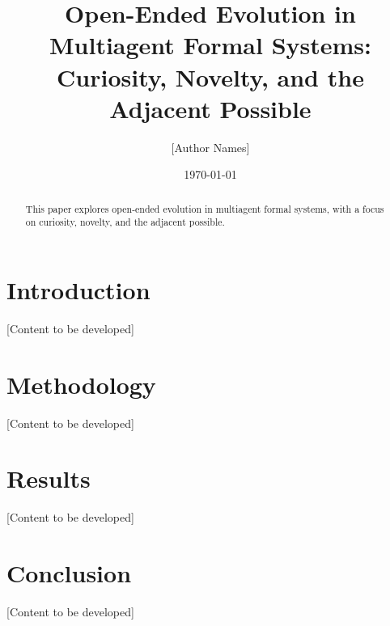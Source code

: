 \documentclass{article}
\title{Open-Ended Evolution in Multiagent Formal Systems: Curiosity, Novelty, and the Adjacent Possible}
\author{[Author Names]}
\date{\today}
\begin{document}
\maketitle

\begin{abstract}
This paper explores open-ended evolution in multiagent formal systems, with a focus on curiosity, novelty, and the adjacent possible.
\end{abstract}

\section{Introduction}

[Content to be developed]

\section{Methodology}

[Content to be developed]

\section{Results}

[Content to be developed]

\section{Conclusion}

[Content to be developed]



\end{document}
